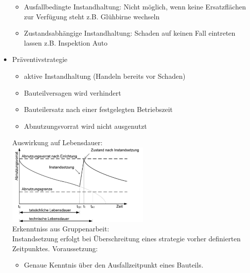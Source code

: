 \documentclass[fleqn,twoside,dvipsnames]{article}
\begin{document}
\begin{itemize}
\begin{minipage}{0.45\textwidth}
                        \end{minipage}
                        \begin{minipage}{0.5\textwidth}
                            \begin{itemize}
                                \item Ausfallbedingte Instandhaltung: Nicht möglich, wenn keine Ersatzflächen zur Verfügung steht z.B. Glühbirne wechseln\\
                                \item Zustandsabhängige Instandhaltung: Schaden auf keinen Fall eintreten lassen z.B. Inspektion Auto
                            \end{itemize}
                        \end{minipage}
            \item Präventivstrategie    
                \begin{itemize}
                    \item aktive Instandhaltung (Handeln bereits vor Schaden)
                    \item Bauteilversagen wird verhindert
                    \item Bauteilersatz nach einer festgelegten Betriebszeit
                    \item Abnutzungsvorrat wird nicht ausgenutzt
                \end{itemize}
                Auswirkung auf Lebensdauer:\\
                \includegraphics[width=0.55\textwidth]{Grafiken/Instandhaltung/Praeventivstrategie.png}\\
                Erkenntniss aus Gruppenarbeit:\\
                Instandsetzung erfolgt bei Überschreitung eines strategie vorher definierten Zeitpunktes.
                Voraussetzung:
                    \begin{itemize}
                        \item Genaue Kenntnis über den Ausfallzeitpunkt eines Bauteils.
                    \end{itemize}

\end{itemize}
\end{document}
